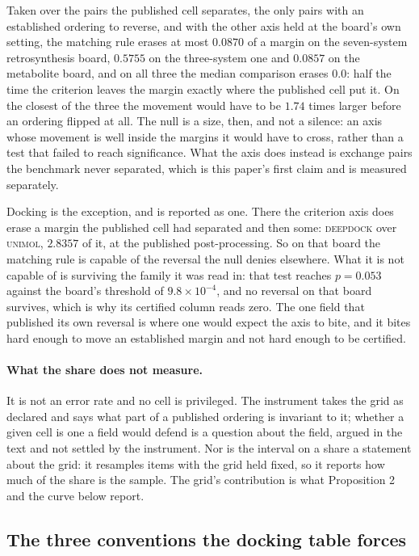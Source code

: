 Taken over the pairs the published cell separates, the only pairs with an established ordering to reverse, and with the other axis held at the board's own setting, the matching rule erases at most
$0.0870$ of a margin on the seven-system retrosynthesis board, $0.5755$ on the three-system one and
$0.0857$ on the metabolite board, and on all three the median comparison erases $0.0$: half the time
the criterion leaves the margin exactly where the published cell put it. On the closest of the three
the movement would have to be $1.74$ times larger before an ordering flipped at all. The null is a
size, then, and not a silence: an axis whose movement is well inside the margins it would have to
cross, rather than a test that failed to reach significance. What the axis does instead is exchange
pairs the benchmark never separated, which is this paper's first claim and is measured separately.

Docking is the exception, and is reported as one. There the criterion axis does erase a margin the
published cell had separated and then some: \textsc{deepdock} over \textsc{unimol}, $2.8357$ of it, at the published post-processing. So on that board the matching rule is capable of the
reversal the null denies elsewhere. What it is not capable of is surviving the family it was read
in: that test reaches $p=0.053$ against the board's threshold of $9.8\times10^{-4}$, and no reversal
on that board survives, which is why its certified column reads zero. The one field that published
its own reversal is where one would expect the axis to bite, and it bites hard enough to move an
established margin and not hard enough to be certified.

\paragraph{What the share does not measure.} It is not an error rate and no cell is privileged.
The instrument takes the grid as declared and says what part of a published ordering is invariant
to it; whether a given cell is one a field would defend is a question about the field, argued in
the text and not settled by the instrument. Nor is the interval on a share a statement about the
grid: it resamples items with the grid held fixed, so it reports how much of the share is the
sample. The grid's contribution is what Proposition 2 and the curve below report.



\subsection{The three conventions the docking table forces}
\label{app:dockingconv}

